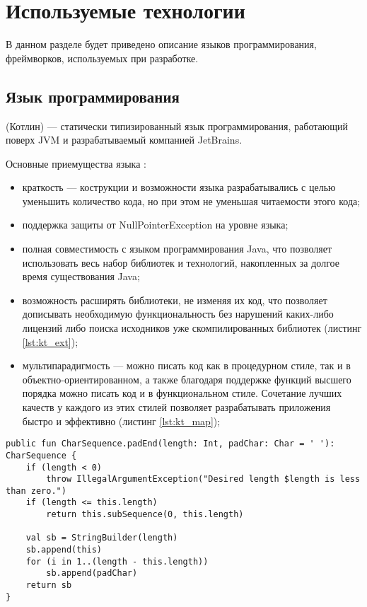 \section{Используемые технологии}

В данном разделе будет приведено описание языков программирования, фреймворков,
используемых при разработке.

\subsection{Язык программирования \kt{}}
\label{sec:kotlin}

\kt{} (Котлин) --- статически типизированный язык программирования, работающий поверх 
JVM и разрабатываемый компанией JetBrains.

Основные приемущества языка \kt{}:
\begin{itemize}
  \item краткость --- кострукции и возможности языка разрабатывались с целью уменьшить 
  количество кода, но при этом не уменьшая читаемости этого кода;
  \item поддержка защиты от NullPointerException на уровне языка;
  \item полная совместимость с языком программирования Java, что позволяет использовать
  весь набор библиотек и технологий, накопленных за долгое время существования Java;
  \item возможность расширять библиотеки, не изменяя их код, что позволяет дописывать необходимую 
  функциональность без нарушений каких-либо лицензий либо поиска исходников уже 
  скомпилированных библиотек (листинг \ref{lst:kt_ext});
  \item мультипарадигмость --- \kt{} можно писать код как в процедурном стиле, так и в 
  объектно-ориентированном, а также благодаря поддержке функций высшего порядка можно 
  писать код и в функциональном стиле. Сочетание лучших качеств у каждого из этих стилей 
  позволяет разрабатывать приложения быстро и эффективно (листинг \ref{lst:kt_map});
\end{itemize} 

\begin{lstlisting}[style = ktstyle, 
           caption = {Пример Extension-функции на языке \kt{}},
           label = {lst:kt_ext}]
public fun CharSequence.padEnd(length: Int, padChar: Char = ' '): CharSequence {
    if (length < 0)
        throw IllegalArgumentException("Desired length $length is less than zero.")
    if (length <= this.length)
        return this.subSequence(0, this.length)

    val sb = StringBuilder(length)
    sb.append(this)
    for (i in 1..(length - this.length))
        sb.append(padChar)
    return sb
}
\end{lstlisting}

